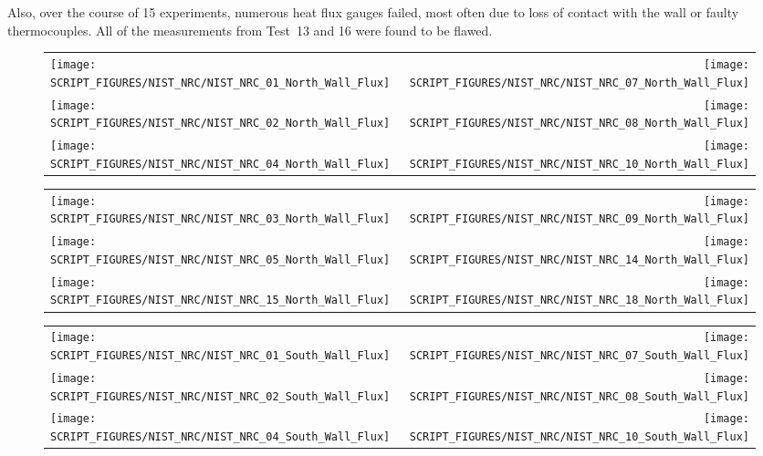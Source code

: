 Also, over the course of 15 experiments, numerous heat flux gauges failed, most often due to loss of contact with the wall or faulty thermocouples. All of the measurements from Test~13 and 16 were found to be flawed.

\newpage

\begin{figure}[p]
\begin{tabular*}{\textwidth}{l@{\extracolsep{\fill}}r}
\texttt{[image: SCRIPT\_FIGURES/NIST\_NRC/NIST\_NRC\_01\_North\_Wall\_Flux]} &
\texttt{[image: SCRIPT\_FIGURES/NIST\_NRC/NIST\_NRC\_07\_North\_Wall\_Flux]} \\
\texttt{[image: SCRIPT\_FIGURES/NIST\_NRC/NIST\_NRC\_02\_North\_Wall\_Flux]} &
\texttt{[image: SCRIPT\_FIGURES/NIST\_NRC/NIST\_NRC\_08\_North\_Wall\_Flux]} \\
\texttt{[image: SCRIPT\_FIGURES/NIST\_NRC/NIST\_NRC\_04\_North\_Wall\_Flux]} &
\texttt{[image: SCRIPT\_FIGURES/NIST\_NRC/NIST\_NRC\_10\_North\_Wall\_Flux]}
\end{tabular*}
\label{NIST_NRC_North_Wall_Flux_Closed}
\end{figure}

\begin{figure}[p]
\begin{tabular*}{\textwidth}{l@{\extracolsep{\fill}}r}
\texttt{[image: SCRIPT\_FIGURES/NIST\_NRC/NIST\_NRC\_03\_North\_Wall\_Flux]} &
\texttt{[image: SCRIPT\_FIGURES/NIST\_NRC/NIST\_NRC\_09\_North\_Wall\_Flux]} \\
\texttt{[image: SCRIPT\_FIGURES/NIST\_NRC/NIST\_NRC\_05\_North\_Wall\_Flux]} &
\texttt{[image: SCRIPT\_FIGURES/NIST\_NRC/NIST\_NRC\_14\_North\_Wall\_Flux]} \\
\texttt{[image: SCRIPT\_FIGURES/NIST\_NRC/NIST\_NRC\_15\_North\_Wall\_Flux]} &
\texttt{[image: SCRIPT\_FIGURES/NIST\_NRC/NIST\_NRC\_18\_North\_Wall\_Flux]}
\end{tabular*}
\label{NIST_NRC_North_Wall_Flux_Open}
\end{figure}

\begin{figure}[p]
\begin{tabular*}{\textwidth}{l@{\extracolsep{\fill}}r}
\texttt{[image: SCRIPT\_FIGURES/NIST\_NRC/NIST\_NRC\_01\_South\_Wall\_Flux]} &
\texttt{[image: SCRIPT\_FIGURES/NIST\_NRC/NIST\_NRC\_07\_South\_Wall\_Flux]} \\
\texttt{[image: SCRIPT\_FIGURES/NIST\_NRC/NIST\_NRC\_02\_South\_Wall\_Flux]} &
\texttt{[image: SCRIPT\_FIGURES/NIST\_NRC/NIST\_NRC\_08\_South\_Wall\_Flux]} \\
\texttt{[image: SCRIPT\_FIGURES/NIST\_NRC/NIST\_NRC\_04\_South\_Wall\_Flux]} &
\texttt{[image: SCRIPT\_FIGURES/NIST\_NRC/NIST\_NRC\_10\_South\_Wall\_Flux]}
\end{tabular*}
\label{NIST_NRC_South_Wall_Flux_Closed}
\end{figure}

